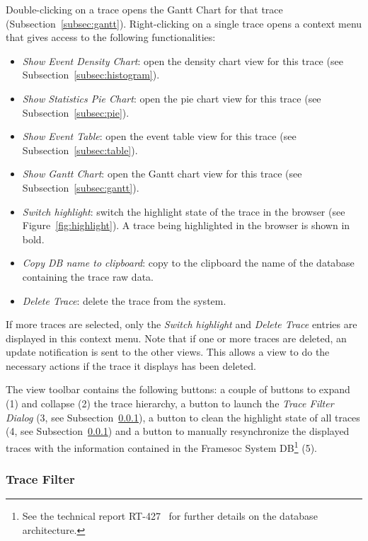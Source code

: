 \documentclass[twoside]{article}
\begin{document}
\begin{sloppypar}
Double-clicking on a trace opens the Gantt Chart for that trace (Subsection~\ref{subsec:gantt}).
Right-clicking on a single trace opens a context menu that gives access to the following functionalities:
\begin{itemize}
 \item \emph{Show Event Density Chart}: open the density chart view for this trace (see Subsection~\ref{subsec:histogram}).
 \item \emph{Show Statistics Pie Chart}: open the pie chart view for this trace (see Subsection~\ref{subsec:pie}).
 \item \emph{Show Event Table}: open the event table view for this trace (see Subsection~\ref{subsec:table}).
 \item \emph{Show Gantt Chart}: open the Gantt chart view for this trace (see Subsection~\ref{subsec:gantt}).
 \item \emph{Switch highlight}: switch the highlight state of the trace in the browser (see Figure~\ref{fig:highlight}). A trace being highlighted in the browser is shown in bold.
 \item \emph{Copy DB name to clipboard}: copy to the clipboard the name of the database containing the trace raw data.
 \item \emph{Delete Trace}: delete the trace from the system.
\end{itemize}
If more traces are selected, only the \emph{Switch highlight} and \emph{Delete Trace} entries are displayed in this context menu.
Note that if one or more traces are deleted, an update notification is sent to the other views.
This allows a view to do the necessary actions if the trace it displays has been deleted.

The view toolbar contains the following buttons: a couple of buttons to expand (\num{1}) and collapse (\num{2}) the trace hierarchy, a button to launch the \emph{Trace Filter Dialog} (\num{3}, see Subsection~\ref{subsubsec:trace_filter}), a button to clean the highlight state of all traces (\num{4}, see Subsection~\ref{subsubsec:trace_filter}) and a button to manually resynchronize the displayed traces with the information contained in the Framesoc System DB\footnote{See the technical report RT-427~\cite{pagano:hal} for further details on the database architecture.} (\num{5}).

\subsubsection{Trace Filter}
\label{subsubsec:trace_filter}


\end{sloppypar}
\end{document}
